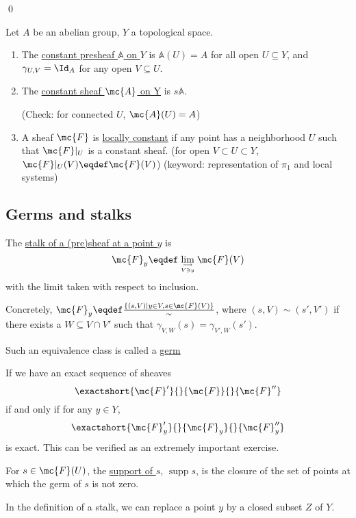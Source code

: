 \documentclass[x11names,reqno,14pt]{extarticle}
\newcommand{\A}{\mathbb{A}}
\DeclareMathOperator{\supp}{supp}
\begin{document}
\qed


Let $A$ be an abelian group, $Y$ a topological space. 

\begin{enumerate}[label=(\alph*)]

\item The \underline{constant presheaf $\A$ on $Y$} is $\A(U) = A$ for all open $U \subseteq Y$, and $\gamma_{U,V} = \Id_A$ for any open $V \subseteq U$. 

\item The \underline{constant sheaf $\mc{A}$ on Y} is $s\A$.

(Check: for connected $U$, $\mc{A}(U) = A$)

\item A sheaf $\mc{F}$ is \underline{locally constant} if any point has a neighborhood $U$ such that $\mc{F}|_U$ is a constant sheaf. (for open $V \subset U \subset Y$, $\mc{F}|_U(V) \eqdef \mc{F}(V)$) (keyword: representation of $\pi_1$ and local systems)

\end{enumerate}

\subsection*{Germs and stalks}


The \underline{stalk of a (pre)sheaf at a point $y$} is
\[
\mc{F}_y \eqdef \lim_{\longrightarrow\atop{V\ni y}}\mc{F}(V)
\]
with the limit taken with respect to inclusion.

Concretely, $\mc{F}_y \eqdef \frac{\{(s, V) \mid y \in V, s \in \mc{F}(V)\}}{\sim}$, where $(s, V) \sim (s', V')$ if there exists a $W \subseteq V \cap V'$ such that $\gamma_{V,W}(s) = \gamma_{V',W}(s')$. 

Such an equivalence class is called a \underline{germ}

\rem [GM, I.5.5, I.5.6]

If we have an exact sequence of sheaves
\[
\exactshort{\mc{F}'}{}{\mc{F}}{}{\mc{F}''}
\]
if and only if for any $y \in Y$, 
\[
\exactshort{\mc{F}_y'}{}{\mc{F}_y}{}{\mc{F}_y''}
\]
is exact. This can be verified as an extremely important exercise.


For $s \in \mc{F}(U)$, the \underline{support of $s$}, $\supp s$, is the closure of the set of points at which the germ of $s$ is not zero. 

\rem 

In the definition of a stalk, we can replace a point $y$ by a closed subset $Z$ of $Y$.
\end{document}
